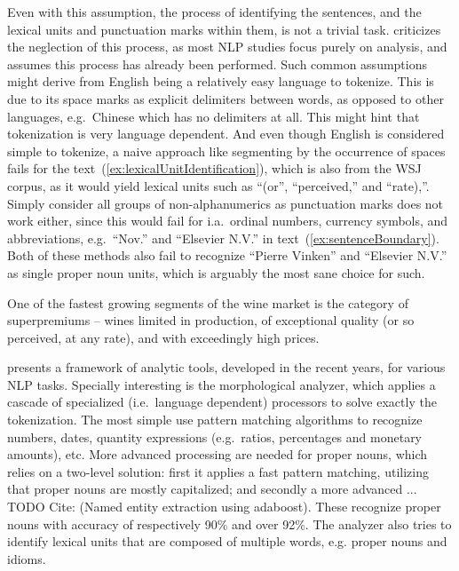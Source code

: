 Even with this assumption, the process of identifying the sentences, and the lexical units and punctuation marks within them, is not a trivial task. \citeauthor{tokenization}  criticizes the neglection of this process, as most NLP studies focus purely on analysis, and assumes this process has already been performed. Such common assumptions might derive from English being a relatively easy language to tokenize. This is due to its space marks as explicit delimiters between words, as opposed to other languages, e.g.\ Chinese which has no delimiters at all. This might hint that tokenization is very language dependent. And even though English is considered simple to tokenize, a naive approach like segmenting by the occurrence of spaces fails for the text~(\ref{ex:lexicalUnitIdentification}), which is also from the WSJ corpus, as it would yield lexical units such as ``(or'', ``perceived,'' and ``rate),''. Simply consider all groups of non-alphanumerics as punctuation marks does not work either, since this would fail for i.a.\ ordinal numbers, currency symbols, and abbreviations, e.g.\ ``Nov.'' and ``Elsevier N.V.'' in text~(\ref{ex:sentenceBoundary}). Both of these methods also fail to recognize ``Pierre Vinken'' and ``Elsevier N.V.'' as single proper noun units, which is arguably the most sane choice for such. 

\begin{numquote}
One of the fastest growing segments of the wine market is the category of superpremiums -- wines limited in production, of exceptional quality (or so perceived, at any rate), and with exceedingly high prices.
  \label{ex:lexicalUnitIdentification}
\end{numquote}

\citeauthor{freeLing}  presents a framework of analytic tools, developed in the recent years, for various NLP tasks. Specially interesting is the morphological analyzer, which applies a cascade of specialized (i.e.\ language dependent) processors to solve exactly the tokenization. The most simple use pattern matching algorithms to recognize numbers, dates, quantity expressions (e.g.\ ratios, percentages and monetary amounts), etc. More advanced processing are needed for proper nouns, which relies on a two-level solution: first it applies a fast pattern matching, utilizing that proper nouns are mostly capitalized; and secondly a more advanced ... TODO Cite: (Named entity extraction using adaboost). These recognize proper nouns with accuracy of respectively 90\% and over 92\%. The analyzer also tries to identify lexical units that are composed of multiple words, e.g. proper nouns and idioms.

